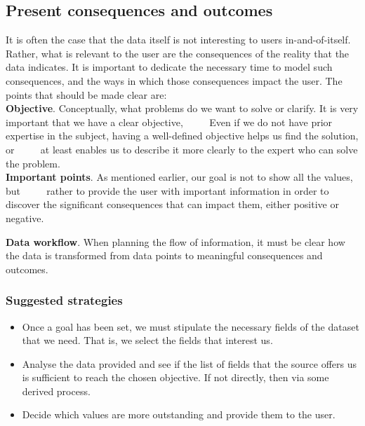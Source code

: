 \subsection{Present consequences and outcomes}

It is often the case that the data itself is not interesting to users in-and-of-itself.
Rather, what is relevant to the user are the consequences of the reality that the data indicates.
It is important to dedicate the necessary time to model such consequences, and the ways in which
those consequences impact the user. The points that should be made clear are: \\

\textbf{Objective}. Conceptually, what problems do we want to solve or clarify. It is very important that we have a clear objective,
     Even if we do not have prior expertise in the subject, having a well-defined objective helps us find the solution, or
     at least enables us to describe it more clearly to the expert who can solve the problem. \\

\textbf{Important points}. As mentioned earlier, our goal is not to show all the values, but
     rather to provide the user with important information in order to discover the significant consequences that can impact them, either positive or negative.


\textbf{Data workflow}. When planning the flow of information, it must be clear how the data is transformed from data points to meaningful consequences and outcomes.

\subsubsection*{Suggested strategies} 

\begin{itemize}
    \item Once a goal has been set, we must stipulate the necessary fields of the dataset that we need. That is, we select the fields that interest us. 
    \item Analyse the data provided and see if the list of fields that the source offers us is sufficient to reach the chosen objective.
    If not directly, then via some derived process.
    \item Decide which values are more outstanding and provide them to the user.
\end{itemize}

